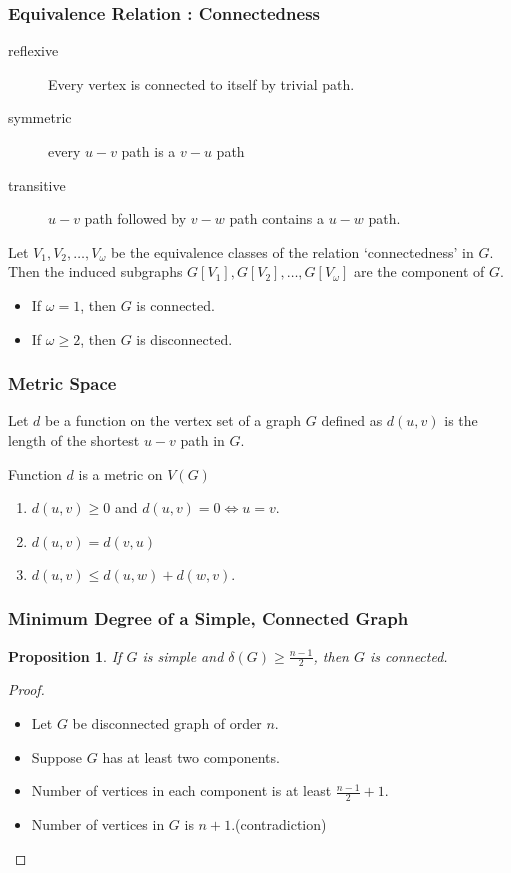 \documentclass{beamer}
\newtheorem{proposition}{Proposition}
\begin{document}
\begin{frame}
	\frametitle{Equivalence Relation : Connectedness}
\begin{description}
	\item[reflexive] Every vertex is connected to itself by trivial path.
	\item[symmetric] every $u-v$ path is a $v-u$ path
	\item[transitive] $u-v$ path followed by $v-w$ path contains a $u-w$ path.
\end{description}

\begin{definition}[component]
	Let $V_1,V_2,\dots,V_\omega$ be the equivalence classes of the relation `connectedness' in $G$.
	Then the induced subgraphs $G[V_1], G[V_2],\dots, G[V_\omega]$ are the component of $G$.
\end{definition}
\begin{itemize}
	\item If $\omega = 1$, then $G$ is connected.
	\item If $\omega \ge 2$, then $G$ is disconnected.
\end{itemize}
\end{frame}

\begin{frame}
\frametitle{Metric Space}%
\begin{definition}
	Let $d$ be a function on the vertex set of a graph $G$ defined as $d(u,v)$ is the length of the shortest $u-v$ path in $G$.
\end{definition}

\begin{block}{Function $d$ is a metric on $V(G)$}
\begin{enumerate}
	\item $d(u,v) \ge 0$ and $d(u,v) = 0 \iff u = v$.
	\item $d(u,v) = d(v,u)$
	\item $d(u,v) \le d(u,w) + d(w,v)$.
\end{enumerate}
\end{block}
\end{frame}

\begin{frame}
	\frametitle{Minimum Degree of a Simple, Connected Graph}%
	\begin{proposition}
		If $G$ is simple and $\delta(G) \ge \frac{n-1}{2}$, then $G$ is connected.
	\end{proposition}
	\begin{proof}
	\begin{itemize}
		\item Let $G$ be disconnected graph of order $n$.
		\item Suppose $G$ has at least two components.
		\item Number of vertices in each component is at least $\frac{n-1}{2}+1$.
		\item Number of vertices in $G$ is $n+1$.(contradiction)
	\end{itemize}
	\end{proof}
\end{frame}
\end{document}
